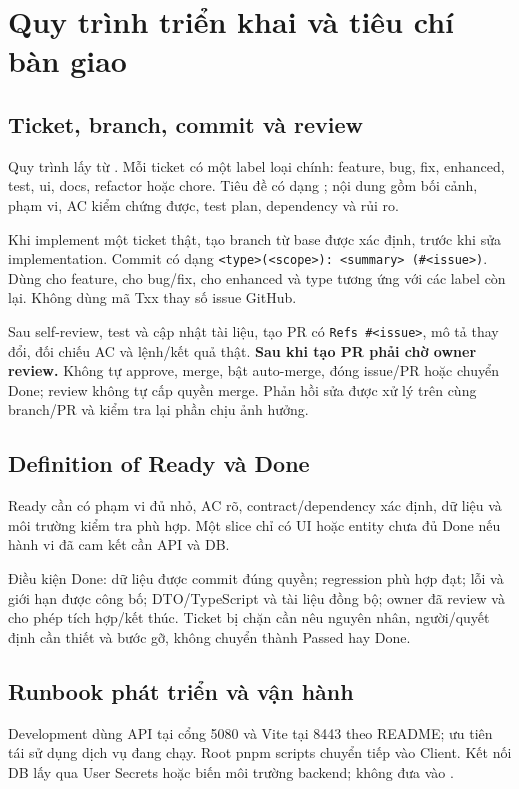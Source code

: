 \chapter{Quy trình triển khai và tiêu chí bàn giao}
\section{Ticket, branch, commit và review}
Quy trình lấy từ . Mỗi ticket có một label loại chính: feature, bug, fix, enhanced, test, ui, docs, refactor hoặc chore. Tiêu đề có dạng ; nội dung gồm bối cảnh, phạm vi, AC kiểm chứng được, test plan, dependency và rủi ro.

Khi implement một ticket thật, tạo branch  từ base được xác định, trước khi sửa implementation. Commit có dạng \texttt{<type>(<scope>): <summary> (\#<issue>)}. Dùng  cho feature,  cho bug/fix,  cho enhanced và type tương ứng với các label còn lại. Không dùng mã Txx thay số issue GitHub.

Sau self-review, test và cập nhật tài liệu, tạo PR có \texttt{Refs \#<issue>}, mô tả thay đổi, đối chiếu AC và lệnh/kết quả thật. \textbf{Sau khi tạo PR phải chờ owner review.} Không tự approve, merge, bật auto-merge, đóng issue/PR hoặc chuyển Done; review không tự cấp quyền merge. Phản hồi sửa được xử lý trên cùng branch/PR và kiểm tra lại phần chịu ảnh hưởng.

\section{Definition of Ready và Done}
Ready cần có phạm vi đủ nhỏ, AC rõ, contract/dependency xác định, dữ liệu và môi trường kiểm tra phù hợp. Một slice chỉ có UI hoặc entity chưa đủ Done nếu hành vi đã cam kết cần API và DB.

Điều kiện Done: dữ liệu được commit đúng quyền; regression phù hợp đạt; lỗi và giới hạn được công bố; DTO/TypeScript và tài liệu đồng bộ; owner đã review và cho phép tích hợp/kết thúc. Ticket bị chặn cần nêu nguyên nhân, người/quyết định cần thiết và bước gỡ, không chuyển thành Passed hay Done.

\section{Runbook phát triển và vận hành}
Development dùng API tại cổng 5080 và Vite tại 8443 theo README; ưu tiên tái sử dụng dịch vụ đang chạy. Root pnpm scripts chuyển tiếp vào Client. Kết nối DB lấy qua User Secrets hoặc biến môi trường backend; không đưa vào .

